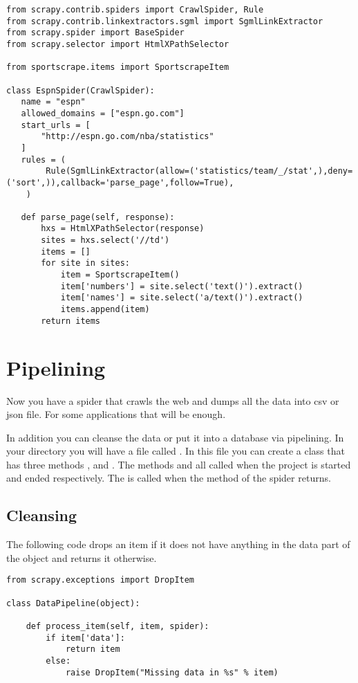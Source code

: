 \begin{lstlisting}
from scrapy.contrib.spiders import CrawlSpider, Rule
from scrapy.contrib.linkextractors.sgml import SgmlLinkExtractor
from scrapy.spider import BaseSpider
from scrapy.selector import HtmlXPathSelector

from sportscrape.items import SportscrapeItem

class EspnSpider(CrawlSpider):
   name = "espn"
   allowed_domains = ["espn.go.com"]
   start_urls = [
       "http://espn.go.com/nba/statistics"
   ]
   rules = (
        Rule(SgmlLinkExtractor(allow=('statistics/team/_/stat',),deny=('sort',)),callback='parse_page',follow=True),
    )

   def parse_page(self, response):
       hxs = HtmlXPathSelector(response)
       sites = hxs.select('//td')
       items = []
       for site in sites:
           item = SportscrapeItem()
           item['numbers'] = site.select('text()').extract()
           item['names'] = site.select('a/text()').extract()
           items.append(item)
       return items
\end{lstlisting}

\section*{Pipelining}
Now you have a spider that crawls the web and dumps all the data into csv or json file. For some applications that will be enough. 

In addition you can cleanse the data or put it into a database via pipelining. In your directory  you will have a file called . In this file you can create a class that has three methods ,  and . The methods  and  all called when the project is started and ended respectively. The  is called when the  method of the spider returns. 

\subsection*{Cleansing}

The following code drops an item if it does not have anything in the data part of the object and returns it otherwise.

\begin{lstlisting}
from scrapy.exceptions import DropItem

class DataPipeline(object):

    def process_item(self, item, spider):
        if item['data']:
            return item
        else:
            raise DropItem("Missing data in %s" % item)
\end{lstlisting}

